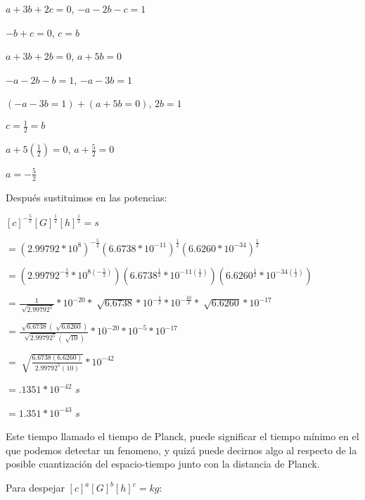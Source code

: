 \documentclass[10pt, a4paper]{article}
\begin{document}
\begin{enumerate}
\begin{itemize}
\begin{center}
                    $a+3b+2c=0$, $-a-2b-c=1$

                    $-b+c=0$, $c=b$

                    $a+3b+2b=0$, $a+5b=0$

                    $-a-2b-b=1$, $-a-3b=1$
                    
                    $(-a-3b=1)+(a+5b=0)$, $2b=1$
                    
                    $c=\frac{1}{2}=b$

                    $a+5(\frac{1}{2})=0$, $a+\frac{5}{2}=0$

                    $a=-\frac{5}{2}$
                \end{center}

                Después sustituimos en las potencias:
                \begin{center}
                    $[c]^{-\frac{5}{2}}[G]^{\frac{1}{2}}[h]^{\frac{1}{2}}=\si{s}$

                    $=(2.99792 * 10^8)^{-\frac{5}{2}}(6.6738 * 10^{-11})^{\frac{1}{2}}(6.6260 * 10^{-34})^{\frac{1}{2}}$

                    $=(2.99792^{-\frac{5}{2}} * 10^{8(-\frac{5}{2})})(6.6738^{\frac{1}{2}} * 10^{-11(\frac{1}{2})})(6.6260^{\frac{1}{2}} * 10^{-34(\frac{1}{2})})$

                    $=\frac{1}{\sqrt[]{2.99792^5}} * 10^{-20} * \sqrt[]{6.6738} * 10^{-\frac{1}{2}} * 10^{-\frac{10}{2}} * \sqrt[]{6.6260} * 10^{-17}$

                    $=\frac{\sqrt[]{6.6738}(\sqrt[]{6.6260})}{\sqrt[]{2.99792^5}(\sqrt[]{10})}*10^{-20}*10^{-5}*10^{-17}$
                    
                    $=\sqrt[]{\frac{6.6738(6.6260)}{2.99792^5(10)}}*10^{-42}$

                    $=.1351*10^{-42}$ $\si{s}$

                    $=1.351*10^{-43}$ $\si{s}$
                \end{center}
                
                Este tiempo llamado el tiempo de Planck, puede significar el tiempo mínimo en el que podemos 
                detectar un fenomeno, y quizá puede decirnos algo al respecto de la posible cuantización del 
                espacio-tiempo junto con la distancia de Planck.

                Para despejar $[c]^{a}[G]^{b}[h]^{c}=\si{kg}$:
                \begin{center}
                

\end{center}
\end{itemize}
\end{enumerate}
\end{document}

